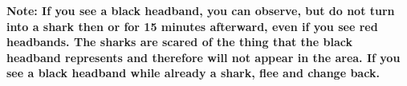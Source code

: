 \documentclass[green]{NeptuneBall}
\begin{document}
{\bf Note: If you see a black headband, you can observe, but do not turn into a shark then or for 15 minutes afterward, even if you see red headbands. The sharks are scared of the thing that the black headband represents and therefore will not appear in the area. If you see a black headband while already a shark, flee and change back.}
\end{document}
